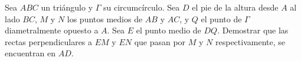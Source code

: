 Sea $ABC$ un triángulo y $\Gamma$ su circumcírculo. Sea $D$ el pie de la altura desde $A$ al lado $BC$, $M$ y $N$ los puntos medios de $AB$ y $AC$, y $Q$ el punto de $\Gamma$ diametralmente opuesto a $A$. Sea $E$ el punto medio de $DQ$. Demostrar que las rectas perpendiculares a $EM$ y $EN$ que pasan por $M$ y $N$ respectivamente, se encuentran en $AD$.
